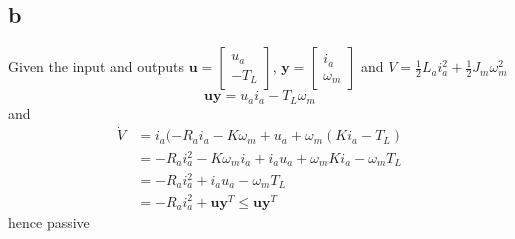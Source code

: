 \documentclass[11pt]{article}
\begin{document}
\subsection*{b}
Given the input and outputs $\mathbf{u} = \begin{bmatrix} u_a \\ -T_L \end{bmatrix}$, $\mathbf{y} = \begin{bmatrix} i_a \\ \omega_m \end{bmatrix}$ and $V = \frac{1}{2} L_a i_a^2 + \frac{1}{2} J_m \omega_m^2$
\[\mathbf{u} \mathbf{y} = u_a i_a - T_L \omega_m\]
and
\begin{eqnarray*}
\dot{V} &= i_a(-R_a i_a - K \omega_m + u_a + \omega_m ( K i_a - T_L) \\
&= - R_a i_a^2 - K \omega_m i_a + i_a u_a + \omega_m K i_a - \omega_m T_L \\
&= - R_a i_a^2 + i_a u_a - \omega_m T_L \\
&= - R_a i_a^2 + \mathbf{u} \mathbf{y}^T \leq \mathbf{u} \mathbf{y}^T
\end{eqnarray*}
hence passive
\end{document}
